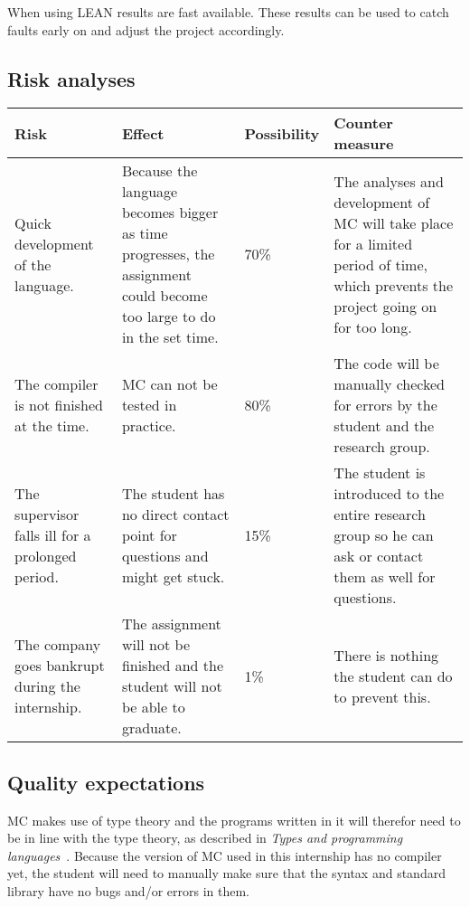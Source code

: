 When using LEAN results are fast available.
These results can be used to catch faults early on and adjust the project accordingly.


\subsection{Risk analyses}
\begin{center}
   \begin{tabular}
      {| p{} | p{} | l | p{} |}
      \hline
      \textbf{Risk} & \textbf{Effect} & \textbf{Possibility} & \textbf{Counter measure}
      \\ \hline
      Quick development of the language. & Because the language becomes bigger as time progresses, the assignment could become too large to do in the set time. & 70\% & The analyses and development of MC will take place for a limited period of time, which prevents the project going on for too long.
      \\ \hline
      The compiler is not finished at the time. & MC can not be tested in practice. & 80\% & The code will be manually checked for errors by the student and the research group.
      \\ \hline
      The supervisor falls ill for a prolonged period. & The student has no direct contact point for questions and might get stuck. & 15\% & The student is introduced to the entire research group so he can ask or contact them as well for questions.
      \\ \hline
      The company goes bankrupt during the internship. & The assignment will not be finished and the student will not be able to graduate. & 1\% & There is nothing the student can do to prevent this.
      \\ \hline
   \end{tabular}
\end{center}

\subsection{Quality expectations}
MC makes use of type theory and the programs written in it will therefor need to be in line with the type theory, as described in \emph{Types and programming languages}~\cite{pierce2002types}.
Because the version of MC used in this internship has no compiler yet, the student will need to manually make sure that the syntax and standard library have no bugs and/or errors in them.

